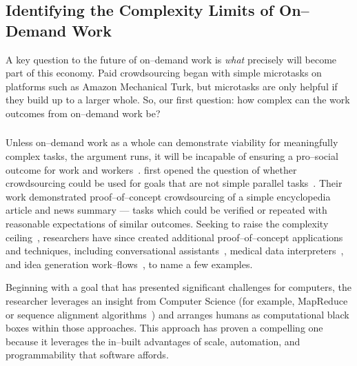 \documentclass[trackingWork]{subfiles}
\begin{document}
\begin{comment}
Crowdwork
  - Kittur said let's do complex stuff
  - This works by using CS techniques
  - Clear that this works in focused cases
  - More recent shift toward using experts
\end{comment}

\subsection[What are the complexity limits of on--demand work]
{Identifying the Complexity Limits of On--Demand Work}\label{sec:complexity}
A key question to the future of on--demand work is
\textit{what} precisely will become part of this economy.
Paid crowdsourcing began with simple microtasks on platforms such as
Amazon Mechanical Turk, but
microtasks are only helpful if they build up to a larger whole.
So, our first question:
how complex can the work outcomes from on--demand work be?

\subsubsection{\crowdworkpers}

Unless on--demand work as a whole can demonstrate viability for meaningfully complex tasks,
the argument runs,
it will be incapable of ensuring a pro--social outcome for work and workers~\cite{crowdworkFuture}.
\citeauthor{crowdForgeKittur} first opened the question of
whether crowdsourcing could be used for goals that are not simple parallel tasks~\cite{crowdForgeKittur}.
Their work demonstrated proof--of--concept crowdsourcing of
a simple encyclopedia article and news summary
--- tasks which could be verified or repeated
with reasonable expectations of similar outcomes.
Seeking to raise the complexity ceiling~\cite{myers2000past},
researchers have since created
additional proof--of--concept applications and techniques,
including conversational assistants~\cite{lasecki2013chorus},
medical data interpreters~\cite{lasecki2013chorus}, and
idea generation work--flows~\cite{YuEncouragingOutside,yu2014distributed,Yu2016a},
to name a few examples.

Beginning with a goal that has
presented significant challenges for computers,
the researcher leverages an insight from Computer Science
(for example, MapReduce~\cite{crowdForgeKittur} or
sequence alignment algorithms~\cite{lasecki2012real})
and arranges humans as computational black boxes within those approaches.
This approach has proven a compelling one because
it leverages the in--built advantages of
scale,
automation, and
programmability that software affords.
\end{document}
